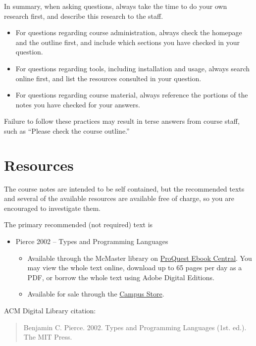 \documentclass[11pt]{article}
\begin{document}
In summary, when asking questions, always take the time to
do your own research first, and describe this research to the staff.
\begin{itemize}
\item For questions regarding course administration,
always check the homepage and the outline first,
and include which sections you have checked in your question.
\item For questions regarding tools, including installation and usage,
always search online first, and list the resources consulted
in your question.
\item For questions regarding course material, always
reference the portions of the notes you have checked
for your answers.
\end{itemize}

Failure to follow these practices may result in
terse answers from course staff, such as
“Please check the course outline.” 

\section{Resources}
\label{sec:org4446ff3}
The course notes are intended to be self contained,
but the recommended texts and several of the available resources
are available free of charge,
so you are encouraged to investigate them.

The primary recommended (not required) text is
\begin{itemize}
\item Pierce 2002 – Types and Programming Languages
\begin{itemize}
\item Available through the McMaster library on
\href{https://ebookcentral.proquest.com/lib/mcmu/detail.action?docID=3338823}{ProQuest Ebook Central}.
You may view the whole text online,
download up to 65 pages per day as a PDF, or
borrow the whole text using Adobe Digital Editions.
\item Available for sale through the
\href{https://campusstore.mcmaster.ca/cgi-mcm/ws/txsub.pl?wsTERMG1=204\&wsDEPTG1=COMPSCI\&wsCOURSEG1=3MI3\&wsSECTIONG1=DAY\%20C01\&crit\_cnt=1}{Campus Store}.
\end{itemize}
\end{itemize}

ACM Digital Library citation:
\begin{quote}
Benjamin C. Pierce. 2002.
Types and Programming Languages (1st. ed.).
The MIT Press.
\end{quote}
\end{document}
